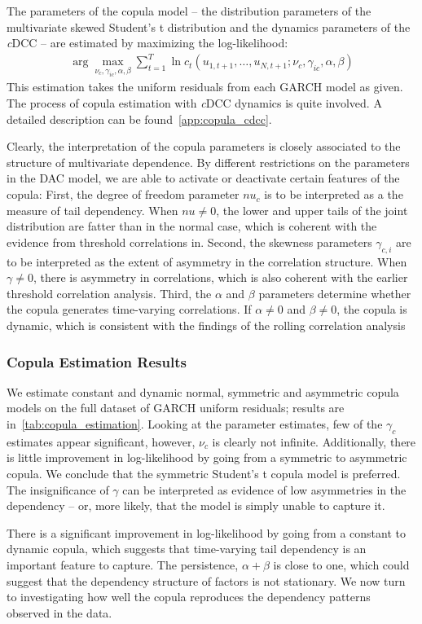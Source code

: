 The parameters of the copula model -- the distribution parameters of the multivariate skewed Student's t distribution and the dynamics parameters of the \emph{c}DCC -- are estimated by maximizing the log-likelihood:
\begin{align}
  \arg\!\max_{\nu_c, \gamma_{ic}, \alpha, \beta} \sum_{t = 1}^T \ln c_t(u_{1, t+1}, \ldots, u_{N, t+1}; \nu_c, \gamma_{ic}, \alpha, \beta)
\end{align}
This estimation takes the uniform residuals from each GARCH model as given. The process of copula estimation with \emph{c}DCC dynamics is quite involved. A detailed description can be found~\autoref{app:copula_cdcc}.

Clearly, the interpretation of the copula parameters is closely associated to the structure of multivariate dependence. By different restrictions on the parameters in the DAC model, we are able to activate or deactivate certain features of the copula: First, the degree of freedom parameter $nu_c$ is to be interpreted as a the measure of tail dependency. When $nu \neq 0$, the lower and upper tails of the joint distribution are fatter than in the normal case, which is coherent with the evidence from threshold correlations in. Second, the skewness parameters $\gamma_{c,i}$ are to be interpreted as the extent of asymmetry in the correlation structure. When $\gamma \neq 0$, there is asymmetry in correlations, which is also coherent with the earlier threshold correlation analysis. Third, the $\alpha$ and $\beta$ parameters determine whether the copula generates time-varying correlations. If $\alpha \neq 0$ and $\beta \neq 0$, the copula is dynamic, which is consistent with the findings of the rolling correlation analysis

\subsubsection{Copula Estimation Results}

We estimate constant and dynamic normal, symmetric and asymmetric copula models on the full dataset of GARCH uniform residuals; results are in~\autoref{tab:copula_estimation}. Looking at the parameter estimates, few of the $\gamma_c$ estimates appear significant, however, $\nu_c$ is clearly not infinite. Additionally, there is little improvement in log-likelihood by going from a symmetric to asymmetric copula. We conclude that the symmetric Student's t copula model is preferred. The insignificance of $\gamma$ can be interpreted as evidence of low asymmetries in the dependency -- or, more likely, that the model is simply unable to capture it.

There is a significant improvement in log-likelihood by going from a constant to dynamic copula, which suggests that time-varying tail dependency is an important feature to capture. The persistence, $\alpha + \beta$ is close to one, which could suggest that the dependency structure of factors is not stationary. We now turn to investigating how well the copula reproduces the dependency patterns observed in the data.




